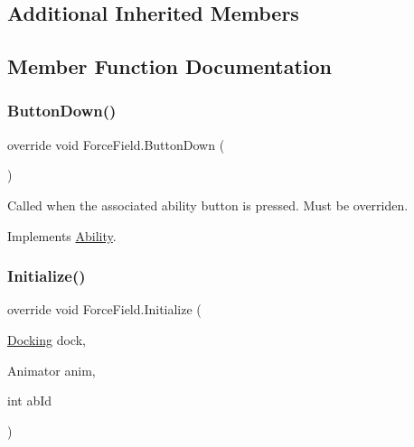 \subsection*{Additional Inherited Members}


\subsection{Member Function Documentation}
\hypertarget{class_force_field_a12dc77bd7d829070d67f182675ff49d1}{}\label{class_force_field_a12dc77bd7d829070d67f182675ff49d1} 
\subsubsection{\texorpdfstring{Button\+Down()}{ButtonDown()}}
{\footnotesize\ttfamily override void Force\+Field.\+Button\+Down (\begin{DoxyParamCaption}{ }\end{DoxyParamCaption})\hspace{0.3cm}{\ttfamily [virtual]}}



Called when the associated ability button is pressed. Must be overriden. 



Implements \hyperlink{class_ability_a7722265862f8b29828315725415ce266}{Ability}.

\hypertarget{class_force_field_aed1ced1b7f1ddb9b0a8f0b8322b2eda1}{}\label{class_force_field_aed1ced1b7f1ddb9b0a8f0b8322b2eda1} 
\subsubsection{\texorpdfstring{Initialize()}{Initialize()}}
{\footnotesize\ttfamily override void Force\+Field.\+Initialize (\begin{DoxyParamCaption}\item[{\hyperlink{class_docking}{Docking}}]{dock,  }\item[{Animator}]{anim,  }\item[{int}]{ab\+Id }\end{DoxyParamCaption})\hspace{0.3cm}{\ttfamily [virtual]}}



